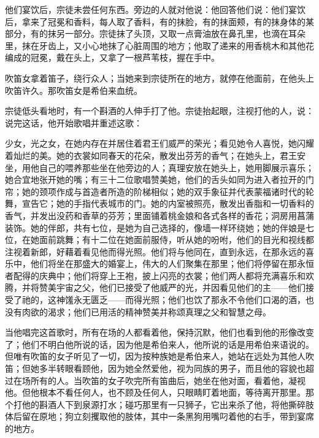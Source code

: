 他们宴饮后，宗徒未尝任何东西。旁边的人就对他说：他回答他们说：他们宴饮后，拿来了冠冕和香料，每人取了香料，有的抹脸，有的抹面颊，有的抹身体的某部分，有的抹另一部分。宗徒抹了头顶，又取一点膏油放在鼻孔里，也滴在耳朵里，抹在牙齿上，又小心地抹了心脏周围的地方；他取了递来的用香桃木和其他花编成的冠冕，戴在头上，又拿了一根芦苇枝，握在手中。\par

吹笛女拿着笛子，绕行众人；当她来到宗徒所在的地方，就停在他面前，在他头上吹笛许久。那吹笛女是希伯来血统。\par

宗徒低头看地时，有一个斟酒的人伸手打了他。宗徒抬起眼，注视打他的人，说：说完这话，他开始歌唱并重述这歌：\par

少女，光之女，在她内存在并居住着君王们威严的荣光；看见她令人喜悦，她闪耀着灿烂的美。她的衣裳如同春天的花朵，散发出芬芳的香气；在她头上，君王安坐，用他自己的喂养那些坐在他旁边的人；真理安放在她头上，她用脚展示喜乐；她合宜地张开她的嘴；有三十二位歌唱赞美她，他们的舌头如同为进入者拉开的门帘；她的颈项作成与首造者所造的阶梯相似；她的双手象征并代表蒙福诸时代的轮舞，宣告它；她的手指代表城市的门。她的内室被照亮，散发出香脂和一切香料的香气，并发出没药和香草的芬芳；里面铺着桃金娘和各式各样的香花；洞房用菖蒲装饰。她的伴郎，共有七位，是她为自己选择的，像墙一样环绕她；她的伴娘是七位，在她面前跳舞；有十二位在她面前服侍，听从她的吩咐，他们的目光和视线都注视着新郎，好藉着看见他而得光照。他们将与他同在，直到永远，在那永远的喜乐中，他们将坐在那盛大的婚宴上，伟大的人们聚集在那里；他们将停留在那永恒者配得的庆典中；他们将穿上王袍，披上闪亮的衣裳；他们两人都将充满喜乐和欢腾，并将赞美宇宙之父，他们已接受了他威严的光，并因看见他们的主——他们接受了祂的，这神馐永无匮乏——而得光照；他们也饮了那永不令他们口渴的酒，也没有肉欲的渴求；他们已用活的精神赞美并称颂真理之父和智慧之母。\par

当他唱完这首歌时，所有在场的人都看着他，保持沉默，他们也看到他的形像改变了；他们不明白他所说的话，因为他是希伯来人，他所说的话是用希伯来语说的。但唯有吹笛的女子听见了一切，因为按种族她是希伯来人，她站在远处为其他人吹笛；但她多半转眼看顾他，因为她全然爱他，视为同族的男子，而且他的容貌也超过在场所有的人。当吹笛的女子吹完所有笛曲后，她坐在他对面，看着他，凝视他。但他根本不看任何人，也不顾及任何人，只眼睛盯着地面，等待离开那里。那个打他的斟酒人下到泉源打水；碰巧那里有一只狮子，它出来杀了他，将他撕碎肢体后留在原地；狗立刻攫取他的肢体，其中一条黑狗用嘴叼着他的右手，带到宴席的地方。\par

